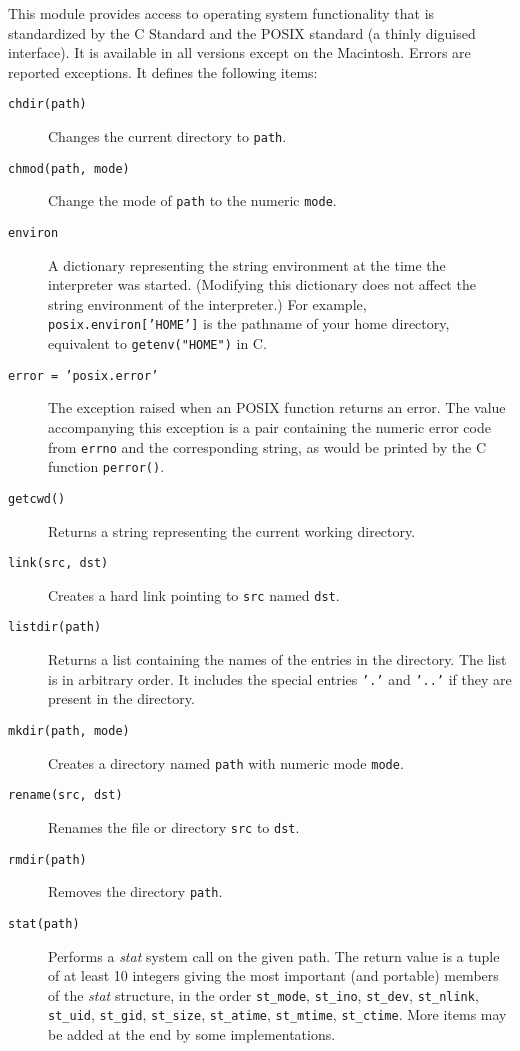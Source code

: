 This module provides access to operating system functionality that is
standardized by the C Standard and the POSIX standard (a thinly diguised
{\UNIX} interface).
It is available in all {\Python} versions except on the Macintosh.
Errors are reported exceptions.
It defines the following items:
\begin{description}
\item[{\tt chdir(path)}]
Changes the current directory to
{\tt path}.
\item[{\tt chmod(path, mode)}]
Change the mode of
{\tt path}
to the numeric
{\tt mode}.
\item[{\tt environ}]
A dictionary representing the string environment at the time
the interpreter was started.
(Modifying this dictionary does not affect the string environment of the
interpreter.)
For example,
{\tt posix.environ['HOME']}
is the pathname of your home directory, equivalent to
{\tt getenv("HOME")}
in C.
\item[{\tt error = 'posix.error'}]
The exception raised when an POSIX function returns an error.
The value accompanying this exception is a pair containing the numeric
error code from
{\tt errno}
and the corresponding string, as would be printed by the C function
{\tt perror()}.
\item[{\tt getcwd()}]
Returns a string representing the current working directory.
\item[{\tt link(src, dst)}]
Creates a hard link pointing to
{\tt src}
named
{\tt dst}.
\item[{\tt listdir(path)}]
Returns a list containing the names of the entries in the
directory.
The list is in arbitrary order.
It includes the special entries
{\tt '.'}
and
{\tt '..'}
if they are present in the directory.
\item[{\tt mkdir(path, mode)}]
Creates a directory named
{\tt path}
with numeric mode
{\tt mode}.
\item[{\tt rename(src, dst)}]
Renames the file or directory
{\tt src}
to
{\tt dst}.
\item[{\tt rmdir(path)}]
Removes the directory
{\tt path}.
\item[{\tt stat(path)}]
Performs a
{\em stat}
system call on the given path.
The return value is a tuple of at least 10 integers giving the most
important (and portable) members of the
{\em stat}
structure, in the order
{\tt st\_mode},
{\tt st\_ino},
{\tt st\_dev},
{\tt st\_nlink},
{\tt st\_uid},
{\tt st\_gid},
{\tt st\_size},
{\tt st\_atime},
{\tt st\_mtime},
{\tt st\_ctime}.
More items may be added at the end by some implementations.

\end{description}
